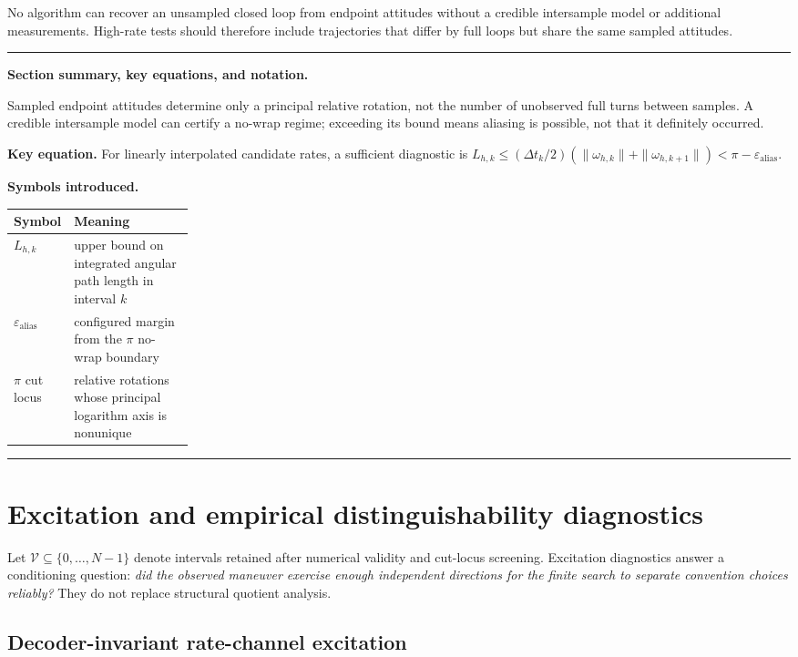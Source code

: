 \documentclass[11pt]{article}
\newenvironment{sectionrecap}
{\par\medskip\begingroup\small\noindent\rule{\linewidth}{0.4pt}\par
\smallskip\noindent\textbf{Section summary, key equations, and notation.}\par\smallskip}
{\par\smallskip\noindent\rule{\linewidth}{0.4pt}\par\endgroup\medskip}
\begin{document}
    No algorithm can recover an unsampled closed loop from endpoint attitudes without a
    credible intersample model or additional measurements. High-rate tests should therefore
    include trajectories that differ by full loops but share the same sampled attitudes.

    \begin{sectionrecap}
        Sampled endpoint attitudes determine only a principal relative rotation, not the number
        of unobserved full turns between samples. A credible intersample model can certify a
        no-wrap regime; exceeding its bound means aliasing is possible, not that it definitely
        occurred.

        \noindent\textbf{Key equation.}
        For linearly interpolated candidate rates, a sufficient diagnostic is
        \(L_{h,k}\le(\Delta t_k/2)(\|\omega_{h,k}\|+\|\omega_{h,k+1}\|)
        <\pi-\varepsilon_{\mathrm{alias}}\).

        \noindent\textbf{Symbols introduced.}
        \par\noindent\begin{tabularx}{\linewidth}{@{}p{0.23\linewidth}Y@{}}
\toprule
Symbol & Meaning \\
\midrule
$L_{h,k}$ & upper bound on integrated angular path length in interval $k$ \\
$\varepsilon_{\mathrm{alias}}$ & configured margin from the $\pi$ no-wrap boundary \\
$\pi$ cut locus & relative rotations whose principal logarithm axis is nonunique \\
\bottomrule
        \end{tabularx}
    \end{sectionrecap}


    \section{Excitation and empirical distinguishability diagnostics}\label{app:excitation}

    Let $\mathcal V\subseteq\{0,\ldots,N-1\}$ denote intervals retained after numerical
    validity and cut-locus screening. Excitation diagnostics answer a conditioning question:
    \emph{did the observed maneuver exercise enough independent directions for the finite
    search to separate convention choices reliably?}  They do not replace structural
    quotient analysis.

    \subsection{Decoder-invariant rate-channel excitation}
\end{document}
